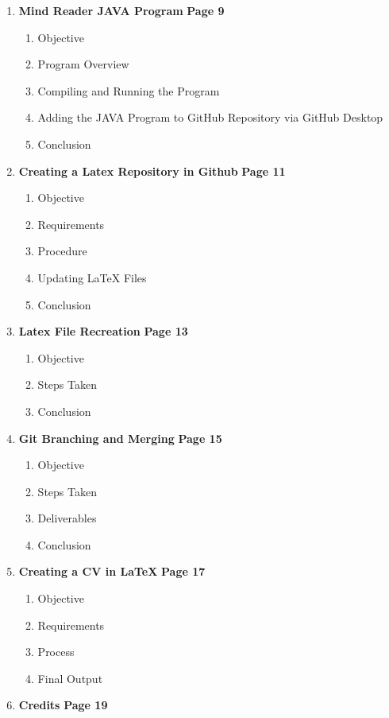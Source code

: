 \begin{enumerate}
    \item \textbf{Mind Reader JAVA Program} \hfill \textbf{Page 9}
    \begin{enumerate}
        \renewcommand{\labelenumii}{\arabic{enumi}.\arabic{enumii}}
        \item Objective
        \item Program Overview
        \item Compiling and Running the Program
        \item Adding the JAVA Program to GitHub Repository via GitHub Desktop
        \item Conclusion
    \end{enumerate}
    
    \item \textbf{Creating a Latex Repository in Github} \hfill \textbf{Page 11}
    \begin{enumerate}
        \renewcommand{\labelenumii}{\arabic{enumi}.\arabic{enumii}}
        \item Objective
        \item Requirements
        \item Procedure
        \item Updating LaTeX Files
        \item Conclusion
    \end{enumerate}
    
    \item \textbf{Latex File Recreation} \hfill \textbf{Page 13}
    \begin{enumerate}
        \renewcommand{\labelenumii}{\arabic{enumi}.\arabic{enumii}}
        \item Objective
        \item Steps Taken
        \item Conclusion
    \end{enumerate}
    
    \item \textbf{Git Branching and Merging} \hfill \textbf{Page 15}
    \begin{enumerate}
        \renewcommand{\labelenumii}{\arabic{enumi}.\arabic{enumii}}
        \item Objective
        \item Steps Taken
        \item Deliverables
        \item Conclusion
    \end{enumerate}
    
    \item \textbf{Creating a CV in LaTeX} \hfill \textbf{Page 17}
    \begin{enumerate}
        \renewcommand{\labelenumii}{\arabic{enumi}.\arabic{enumii}}
        \item Objective
        \item Requirements
        \item Process
        \item Final Output
    \end{enumerate}
    
    \item \textbf{Credits} \hfill \textbf{Page 19}
\end{enumerate}
